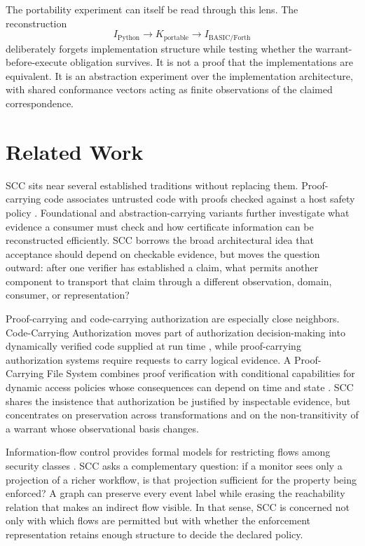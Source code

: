 \documentclass[11pt]{article}
\begin{document}
The portability experiment can itself be read through this lens. The reconstruction
\[
I_{\mathrm{Python}}\rightarrow K_{\mathrm{portable}}\rightarrow I_{\mathrm{BASIC/Forth}}
\]
deliberately forgets implementation structure while testing whether the warrant-before-execute obligation survives. It is not a proof that the implementations are equivalent. It is an abstraction experiment over the implementation architecture, with shared conformance vectors acting as finite observations of the claimed correspondence.

\section{Related Work}
SCC sits near several established traditions without replacing them. Proof-carrying code associates untrusted code with proofs checked against a host safety policy \cite{necula1997proof}. Foundational and abstraction-carrying variants further investigate what evidence a consumer must check and how certificate information can be reconstructed efficiently. SCC borrows the broad architectural idea that acceptance should depend on checkable evidence, but moves the question outward: after one verifier has established a claim, what permits another component to transport that claim through a different observation, domain, consumer, or representation?

Proof-carrying and code-carrying authorization are especially close neighbors. Code-Carrying Authorization moves part of authorization decision-making into dynamically verified code supplied at run time \cite{maffeis2008cca}, while proof-carrying authorization systems require requests to carry logical evidence. A Proof-Carrying File System combines proof verification with conditional capabilities for dynamic access policies whose consequences can depend on time and state \cite{garg2010pcfs}. SCC shares the insistence that authorization be justified by inspectable evidence, but concentrates on preservation across transformations and on the non-transitivity of a warrant whose observational basis changes.

Information-flow control provides formal models for restricting flows among security classes \cite{denning1976lattice}. SCC asks a complementary question: if a monitor sees only a projection of a richer workflow, is that projection sufficient for the property being enforced? A graph can preserve every event label while erasing the reachability relation that makes an indirect flow visible. In that sense, SCC is concerned not only with which flows are permitted but with whether the enforcement representation retains enough structure to decide the declared policy.
\end{document}

